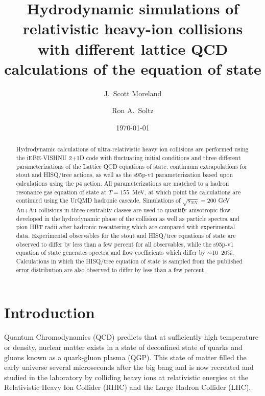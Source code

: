 \documentclass[aps,prc,reprint,amsmath,nofootinbib,superscriptaddress]{revtex4-1}
\begin{document}
\title{Hydrodynamic simulations of relativistic heavy-ion collisions\\ with different lattice QCD calculations of the equation of state}

\author{J.\ Scott Moreland}
\author{Ron A.\ Soltz}

\date{\today}

\begin{abstract}
Hydrodynamic calculations of ultra-relativistic heavy ion collisions are performed using the iEBE-VISHNU 2+1D code with fluctuating initial conditions and three different parameterizations of the Lattice QCD equations of state: continuum extrapolations for stout and HISQ/tree actions, as well as the s95p-v1 parameterization based upon calculations using the p4 action.  All parameterizations are matched to a hadron resonance gas equation of state at $T=155$~MeV, at which point the calculations are continued using the UrQMD hadronic cascade. Simulations of $\sqrt{s_{NN}}=200$ GeV Au+Au collisions in three centrality classes are used to quantify anisotropic flow developed in the hydrodynamic phase of the collision as well as particle spectra and pion HBT radii after hadronic rescattering which are compared with experimental data. Experimental observables for the stout and HISQ/tree equations of state are observed to differ by less than a few percent for all observables, while the s95p-v1 equation of state generates spectra and flow coefficients which differ by $\sim$10--20\%. Calculations in which the HISQ/tree equation of state is sampled from the published error distribution are also observed to differ by less than a few percent.
\end{abstract}

\maketitle

\section{Introduction}

Quantum Chromodynamics (QCD) predicts that at sufficiently high temperature or density, nuclear matter exists in a state of deconfined state of quarks and gluons known as a quark-gluon plasma (QGP). 
This state of matter filled the early universe several microseconds after the big bang and is now recreated and studied in the laboratory by colliding heavy ions at relativistic energies at the Relativistic Heavy Ion Collider (RHIC) and the Large Hadron Collider (LHC).
\end{document}
